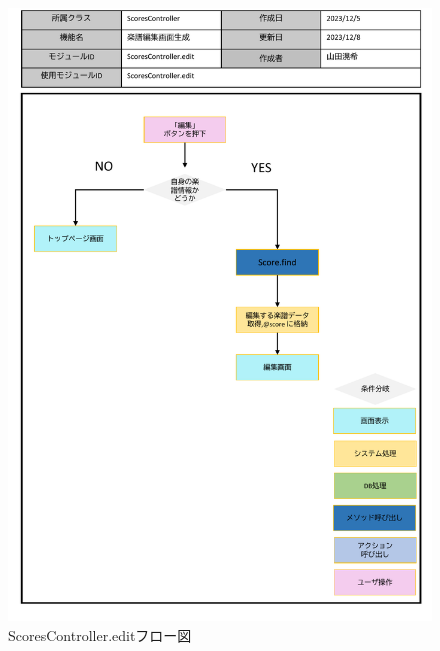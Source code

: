 \begin{figure}
    \centering
    \includegraphics[scale=0.7]{img/Scores/pptx/ScoresController_edit.pdf}
    \caption{ScoresController.editフロー図}
\end{figure}
